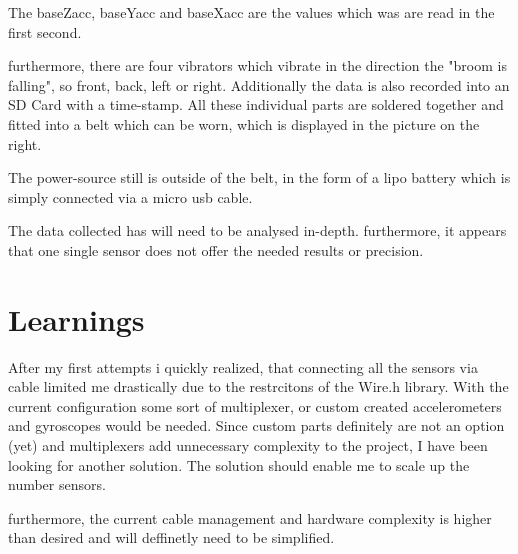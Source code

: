 The baseZacc, baseYacc and baseXacc are the values which was are read in the first second. 

furthermore, there are four vibrators  which vibrate in the direction the "broom is falling", so front, back, left or right. Additionally the data is also recorded into an SD Card with a time-stamp. All these individual parts are soldered together and fitted into a belt which can be worn, which is displayed in the picture on the right.

The power-source still is outside of the belt, in the form of a lipo battery which is simply connected via a micro usb cable.

The data collected has will need to be analysed in-depth. furthermore, it appears that one single sensor does not offer the needed results or precision.

\section{Learnings}

After my first attempts i quickly realized, that connecting all the sensors via cable limited me drastically due to the restrcitons of the Wire.h library. With the current configuration some sort of multiplexer, or custom created accelerometers and gyroscopes would be needed. Since custom parts definitely are not an option (yet) and multiplexers add unnecessary complexity to the project, I have been looking for another solution. The solution should enable me to scale up the number sensors. 

furthermore, the current cable management and hardware complexity is higher than desired and will deffinetly need to be simplified.

